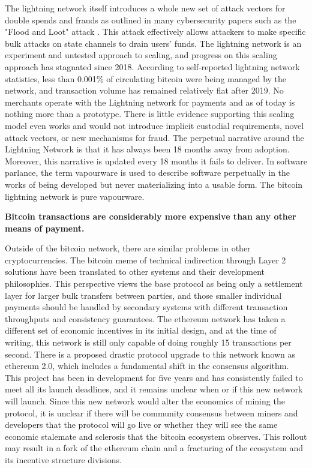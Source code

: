 
The lightning network itself introduces a whole new set of attack vectors for
double spends and frauds as outlined in many cybersecurity papers such as the
"Flood and Loot" attack \cite{harris_flood_2020}. This attack effectively allows
attackers to make specific bulk attacks on state channels to drain users' funds.
The lightning network is an experiment and untested approach to scaling, and
progress on this scaling approach has stagnated since 2018. According to
self-reported lightning network statistics, less than 0.001\% of circulating
bitcoin were being managed by the network, and transaction volume has remained
relatively flat after 2019. No merchants operate with the Lightning network for
payments and as of today is nothing more than a prototype. There is little
evidence supporting this scaling model even works and would not introduce
implicit custodial requirements, novel attack vectors, or new mechanisms for
fraud. The perpetual narrative around the Lightning Network is that it has
always been 18 months away from adoption. Moreover, this narrative is updated
every 18 months it fails to deliver. In software parlance, the term vapourware
is used to describe software perpetually in the works of being developed but
never materializing into a usable form. The bitcoin lightning network is pure
vapourware. \cite{rosenthal_stanford_nodate}

\begin{infobox}
 \textbf{Bitcoin transactions are considerably more expensive than any other means of payment.}
\end{infobox}

Outside of the bitcoin network, there are similar problems in other
cryptocurrencies. The bitcoin meme of technical indirection through Layer 2
solutions have been translated to other systems and their development
philosophies. This perspective views the base protocol as being only a
settlement layer for larger bulk transfers between parties, and those smaller
individual payments should be handled by secondary systems with different
transaction throughputs and consistency guarantees. The ethereum network has
taken a different set of economic incentives in its initial design, and at the
time of writing, this network is still only capable of doing roughly 15
transactions per second. There is a proposed drastic protocol upgrade to this
network known as ethereum 2.0, which includes a fundamental shift in the
consensus algorithm. This project has been in development for five years and has
consistently failed to meet all its launch deadlines, and it remains unclear
when or if this new network will launch. Since this new network would alter the
economics of mining the protocol, it is unclear if there will be community
consensus between miners and developers that the protocol will go live or
whether they will see the same economic stalemate and sclerosis that the bitcoin
ecosystem observes. This rollout may result in a fork of the ethereum chain and
a fracturing of the ecosystem and its incentive structure divisions.

